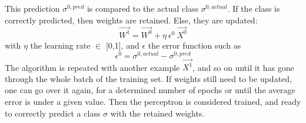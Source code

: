 \clearpage

\begin{algorithm}
      \begin{algorithmic}[1]
        \STATE This prediction $\sigma^{0,pred}$ is compared to the actual class $\sigma^{0,actual}$. 
        \STATEx If the class is correctly predicted, then weights are retained.
        \STATEx Else, they are updated: 
        \begin{equation}
            \overrightarrow{W^1} = \overrightarrow{W^0} + \eta \ \epsilon^0 \ \overrightarrow{X^0}
        \end{equation}
        \STATEx with $\eta$ the learning rate $\in$ [0,1], and $\epsilon$ the error function such as 
        \begin{equation}
            \epsilon^0 = \sigma^{0,actual} - \sigma^{0,pred}
        \end{equation}
        \STATE The algorithm is repeated with another example $\overrightarrow{X^1}$, and so on until it has gone through the whole batch of the training set. If weights still need to be updated, one can go over it again, for a determined number of epochs or until the average error is under a given value. Then the perceptron is considered trained, and ready to correctly predict a class $\sigma$ with the retained weights.
      \end{algorithmic}
\end{algorithm}

